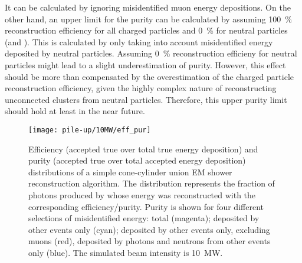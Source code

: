 It can be calculated by ignoring misidentified muon energy depositions.
On the other hand, an upper limit for the purity can be calculated by assuming \SI{100}{\percent} reconstruction efficiency for all charged particles and \SI{0}{\percent} for neutral particles (\Pgpz and \Pgg).
This is calculated by only taking into account misidentified energy deposited by neutral particles.
Assuming \SI{0}{\percent} reconstruction efficieny for neutral particles might lead to a slight underestimation of purity.
However, this effect should be more than compensated by the overestimation of the charged particle reconstruction efficiency, given the highly complex nature of reconstructing unconnected clusters from neutral particles.
Therefore, this upper purity limit should hold at least in the near future.

\begin{figure}[htb]
	\centering
	\texttt{[image: pile-up/10MW/eff\_pur]}
	\caption{Efficiency (accepted true over total true energy deposition) and purity (accepted true over total accepted energy deposition) distributions of a simple cone-cylinder union EM shower reconstruction algorithm.
	The distribution represents the fraction of photons produced by \Pgpz whose energy was reconstructed with the corresponding efficiency/purity.
	Purity is shown for four different selections of misidentified energy: total (magenta); deposited by other events only (cyan); deposited by other events only, excluding muons (red), deposited by photons and neutrons from other events only (blue).
	The simulated beam intensity is \SI{10}{\mega\watt}.}
	\label{fig:dune-nd_10MW-eff-pur}
\end{figure}

